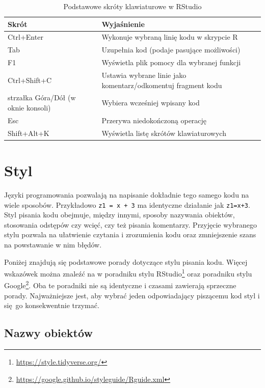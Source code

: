 \documentclass[paper=6in:9in,pagesize=pdftex,headinclude=on,footinclude=on,10pt]{scrbook}
\DeclareRobustCommand{\href}[2]{#2\footnote{\url{#1}}}
\begin{document}
\begin{table}

\caption{\label{tab:rstudiosk}Podstawowe skróty klawiaturowe w RStudio}
\centering
\begin{tabular}[t]{>{\raggedright\arraybackslash}p{12em}>{\raggedright\arraybackslash}p{18em}}
\toprule
Skrót & Wyjaśnienie\\
\midrule
Ctrl+Enter & Wykonuje wybraną linię kodu w skrypcie R\\
Tab & Uzupełnia kod (podaje pasujące możliwości)\\
F1 & Wyświetla plik pomocy dla wybranej funkcji\\
Ctrl+Shift+C & Ustawia wybrane linie jako komentarz/odkomentuj fragment kodu\\
strzałka Góra/Dół (w oknie konsoli) & Wybiera wcześniej wpisany kod\\
\addlinespace
Esc & Przerywa niedokończoną operację\\
Shift+Alt+K & Wyświetla listę skrótów klawiaturowych\\
\bottomrule
\end{tabular}
\end{table}

\hypertarget{styl}{%
\section{Styl}\label{styl}}

Języki programowania pozwalają na napisanie dokładnie tego samego kodu na wiele sposobów.
Przykładowo \texttt{z1\ =\ x\ +\ 3} ma identyczne działanie jak \texttt{z1=x+3}.
Styl pisania kodu obejmuje, między innymi, sposoby nazywania obiektów, stosowania odstępów czy wcięć, czy też pisania komentarzy.
Przyjęcie wybranego stylu pozwala na ułatwienie czytania i zrozumienia kodu oraz zmniejszenie szans na powstawanie w nim błędów.

Poniżej znajdują się podstawowe porady dotyczące stylu pisania kodu.
Więcej wskazówek można znaleźć na w \href{https://style.tidyverse.org/}{poradniku stylu RStudio} oraz \href{https://google.github.io/styleguide/Rguide.xml}{poradniku stylu Google}.
Oba te poradniki nie są identyczne i czasami zawierają sprzeczne porady.
Najważniejsze jest, aby wybrać jeden odpowiadający piszącemu kod styl i się~go konsekwentnie trzymać.

\hypertarget{nazwy-obiektow}{%
\subsection{Nazwy obiektów}\label{nazwy-obiektow}}
\end{document}
